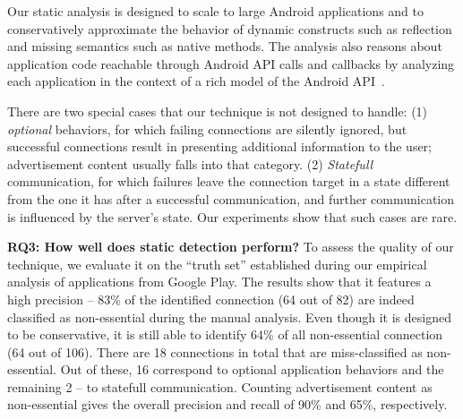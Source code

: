 Our static analysis is designed to scale to large Android applications
and to conservatively approximate the behavior of dynamic constructs
such as reflection and missing semantics such as native methods.  The
analysis also reasons about application code reachable through Android
API calls and callbacks by analyzing each application in the context
of a rich model of the Android
API~\cite{Gordon:Kim:Perkins:Gilham:Nguyen:Rinard:NDSS15}. 

There are two special cases that our technique is not designed to handle: (1) \emph{optional} behaviors, for which failing connections are silently ignored, but successful connections result in presenting additional information to the user; 
advertisement content usually falls into that category. (2) \emph{Statefull} communication, for which failures leave the 
connection target in a state different from the one it has after a successful communication, and further communication is influenced by the server's state. Our experiments show that such cases are rare. 

%
 



\vspace{0.1in}
\noindent 
{\bf RQ3: How well does static detection perform?}
To assess the quality of our technique, we evaluate it on the ``truth set'' established during our empirical analysis of applications from Google Play.
The results show that it features a high precision -- 83\% of the identified connection (64 out of 82) are indeed classified as non-essential during the manual analysis. Even though it is designed to be conservative, it is still able to identify  64\% of all non-essential connection (64 out of 106).
There are 18 connections in total that are miss-classified as non-essential. Out of these, 16 correspond to optional application behaviors and the remaining 2 -- to statefull communication. Counting advertisement content as non-essential
gives the overall precision and recall of 90\% and 65\%, respectively.  

